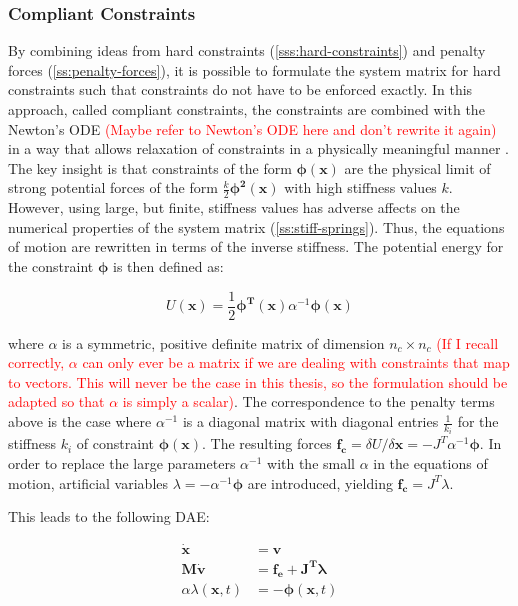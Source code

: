 \subsubsection*{Compliant Constraints}
By combining ideas from hard constraints (\cref{sss:hard-constraints}) and penalty forces (\cref{ss:penalty-forces}), it is possible to 
formulate the system matrix for hard constraints such that constraints do not have to be enforced exactly. In this approach, called compliant 
constraints, the constraints are combined with the Newton's ODE \textcolor{red}{(Maybe refer to Newton's ODE here and don't rewrite it
again)} in a way that allows relaxation of constraints in a physically meaningful manner \cite{servin2006}. The key insight is that constraints 
of the form $\bm{\phi(x)}$ are the physical limit of strong potential forces of the form $\frac{k}{2}\bm{\phi^2(x)}$ with high stiffness values 
$k$. However, using large, but finite, stiffness values has adverse affects on the numerical properties of the system matrix 
(\cref{ss:stiff-springs}). Thus, the equations of motion are rewritten in terms of the inverse stiffness. The potential energy for the 
constraint $\bm{\phi}$ is then defined as:

\[
    U(\bm{x}) = \frac{1}{2}\bm{\phi^T(x)} \alpha^{-1}\bm{\phi(x)}
\]

where $\alpha$ is a symmetric, positive definite matrix of dimension $n_c \times n_c$ \textcolor{red}{(If I recall correctly, $\alpha$ can only
ever be a matrix if we are dealing with constraints that map to vectors. This will never be the case in this thesis, so the formulation should
be adapted so that $\alpha$ is simply a scalar)}. The correspondence to the penalty terms above is the case where $\alpha^{-1}$ is a diagonal 
matrix with diagonal entries $\frac{1}{k_i}$ for the stiffness $k_i$ of constraint $\bm{\phi(x)}$. The resulting forces $\bm{f_c} = \delta U / 
\delta \bm{x} = -J^T\alpha^{-1} \bm{\phi}$. In order to replace the large parameters $\alpha^{-1}$ with the small $\alpha$ in the equations of 
motion, artificial variables $\lambda = -\alpha^{-1}\bm{\phi}$ are introduced, yielding $\bm{f_c} = J^T\lambda$.

This leads to the following DAE:

\begin{align*}
    \bm{\dot{x}} &= \bm{v} \\
    \bm{M\dot{v}} &= \bm{f_{e} + J^T\lambda} \\
    \alpha\lambda(\bm{x}, t) &= -\bm{\phi}(\bm{x}, t)
\end{align*}

